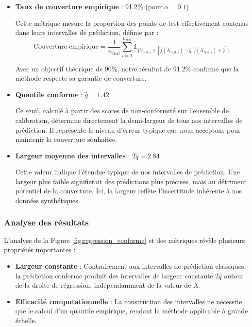 \documentclass[a4paper,12pt]{article}
\begin{document}
\begin{itemize}


\item \textbf{Taux de couverture empirique} : 91.2\% (pour $\alpha = 0.1$)
    
    Cette métrique mesure la proportion des points de test effectivement contenus dans leurs intervalles de prédiction, définie par :
    $$\text{Couverture empirique} = \frac{1}{n_{test}} \sum_{i=1}^{n_{test}} \mathds{1}_{\{Y_{test,i} \in [\hat{f}(X_{test,i}) - \hat{q}, \hat{f}(X_{test,i}) + \hat{q}]\}}$$
    
     Avec un objectif théorique de 90\%, notre résultat de 91.2\% confirme que la méthode respecte sa garantie de couverture. \\
     \item \textbf{Quantile conforme} : $\hat{q} = 1.42$
    
    Ce seuil, calculé à partir des scores de non-conformité sur l'ensemble de calibration, détermine directement la demi-largeur de tous nos intervalles de prédiction. Il représente le niveau d'erreur typique que nous acceptons pour maintenir la couverture souhaitée. \\
    
\item \textbf{Largeur moyenne des intervalles} : $2\hat{q} = 2.84$
    
    Cette valeur indique l'étendue typique de nos intervalles de prédiction. Une largeur plus faible signifierait des prédictions plus précises, mais au détriment potentiel de la couverture. Ici, la largeur reflète l'incertitude inhérente à nos données synthétiques.\\


\end{itemize}

\subsubsection{Analyse des résultats}

L'analyse de la Figure \ref{fig:regression_conforme} et des métriques révèle plusieurs propriétés importantes :

\begin{itemize}


\item \textbf{Largeur constante} : Contrairement aux intervalles de prédiction classiques, la prédiction conforme produit des intervalles de largeur constante $2\hat{q}$ autour de la droite de régression, indépendamment de la valeur de $X$.



\item \textbf{Efficacité computationnelle} : La construction des intervalles ne nécessite que le calcul d'un quantile empirique, rendant la méthode applicable à grande échelle. \\
\end{itemize}
\end{document}

